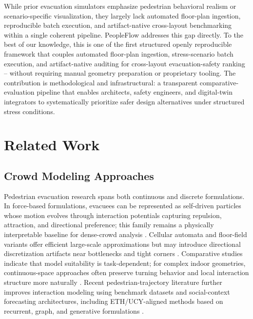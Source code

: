 \documentclass[utf8]{FrontiersinHarvard}
\begin{document}
While prior evacuation simulators emphasize pedestrian behavioral realism or scenario-specific visualization, they largely lack automated floor-plan ingestion, reproducible batch execution, and artifact-native cross-layout benchmarking within a single coherent pipeline. PeopleFlow addresses this gap directly. To the best of our knowledge, this is one of the first structured openly reproducible framework that couples automated floor-plan ingestion, stress-scenario batch execution, and artifact-native auditing for cross-layout evacuation-safety ranking -- without requiring manual geometry preparation or proprietary tooling. The contribution is methodological and infrastructural: a transparent comparative-evaluation pipeline that enables architects, safety engineers, and digital-twin integrators to systematically prioritize safer design alternatives under structured stress conditions.

\section{Related Work}
\subsection{Crowd Modeling Approaches}
Pedestrian evacuation research spans both continuous and discrete formulations. In force-based formulations, evacuees can be represented as self-driven particles whose motion evolves through interaction potentials capturing repulsion, attraction, and directional preference; this family remains a physically interpretable baseline for dense-crowd analysis \cite{sfm,helbing2000}. Cellular automata and floor-field variants offer efficient large-scale approximations but may introduce directional discretization artifacts near bottlenecks and tight corners \cite{ca,kirchner2002}. Comparative studies indicate that model suitability is task-dependent; for complex indoor geometries, continuous-space approaches often preserve turning behavior and local interaction structure more naturally \cite{zheng2009,duives2013,crowd_book}.
Recent pedestrian-trajectory literature further improves interaction modeling using benchmark datasets and social-context forecasting architectures, including ETH/UCY-aligned methods based on recurrent, graph, and generative formulations \cite{pellegrini2009eth,alahi2016sociallstm,gupta2018socialgan,salzmann2020trajectron,mohamed2020stgcnn,zhou2021astgnn,chen2021intention,li2020recurrent,wang2023timtraj,saleh2022transformer}.
\end{document}

